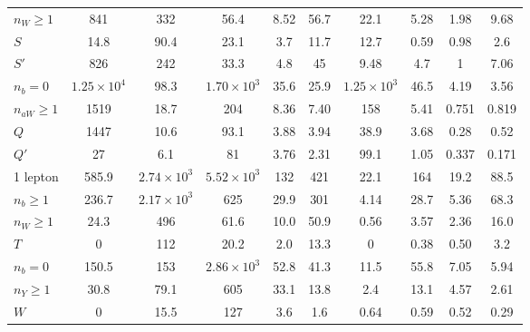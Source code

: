 \begin{sidewaystable}[p]
{\begin{tabular}{ l | c  c  c  c  c  c  c  c  c }
$n_W \geq 1$ & 841 & 332 & 56.4 & 8.52 & 56.7 & 22.1 & 5.28 & 1.98 & 9.68   \\
$S$ & 14.8 & 90.4 & 23.1 & 3.7 & 11.7 & 12.7 & 0.59 & 0.98 & 2.6 \\
$S'$ & 826 & 242 & 33.3 & 4.8 & 45 & 9.48 & 4.7 & 1 & 7.06 \\
\midrule[.02em]
$n_b = 0$ & $1.25\times 10^4$ & 98.3 & $1.70\times 10^3$ & 35.6 & 25.9 & $1.25\times 10^3$ & 46.5 &
4.19 & 3.56 \\
$n_{aW} \geq 1$ & 1519 & 18.7 & 204 & 8.36 & 7.40 & 158 & 5.41 & 0.751 & 0.819 \\
$Q$ & 1447 & 10.6 & 93.1 & 3.88 & 3.94 & 38.9 & 3.68 & 0.28 & 0.52  \\
$Q'$ & 27 & 6.1 & 81 & 3.76 & 2.31 & 99.1 & 1.05 & 0.337 & 0.171  \\
\midrule
1 lepton & 585.9 & $2.74\times 10^3$ & $5.52\times 10^3$ & 132 & 421 & 22.1 & 164 & 19.2 & 88.5 \\
\midrule[.02em]
$n_b \geq 1$ & 236.7 & $2.17\times 10^3$ & 625 & 29.9 & 301 & 4.14 & 28.7 & 5.36 & 68.3 \\
$n_W \geq 1$ & 24.3 & 496 & 61.6 & 10.0 & 50.9 & 0.56 & 3.57 & 2.36 & 16.0  \\
$T$ & 0 & 112 & 20.2 & 2.0 & 13.3 & 0 & 0.38 & 0.50 & 3.2  \\
\midrule[.02em]
$n_b = 0$ & 150.5 & 153 & $2.86\times 10^3$ & 52.8 & 41.3 & 11.5 & 55.8 & 7.05 & 5.94 \\
$n_Y \geq 1$ & 30.8 & 79.1 & 605 & 33.1 & 13.8 & 2.4 & 13.1 & 4.57 & 2.61  \\
$W$ & 0 & 15.5 & 127 & 3.6 & 1.6 & 0.64 & 0.59 & 0.52 & 0.29  \\
\bottomrule
\end{tabular}
}
\label{tab:cutflow}
\end{sidewaystable}


